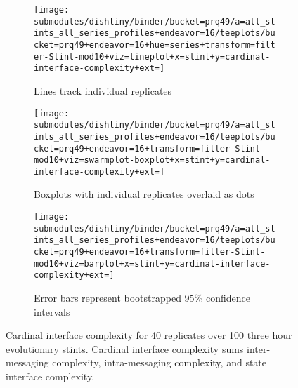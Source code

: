 \begin{figure}
\begin{center}

\begin{subfigure}[b]{\textwidth}
\centering
\texttt{[image: submodules/dishtiny/binder/bucket=prq49/a=all\_stints\_all\_series\_profiles+endeavor=16/teeplots/bucket=prq49+endeavor=16+hue=series+transform=filter-Stint-mod10+viz=lineplot+x=stint+y=cardinal-interface-complexity+ext=]}%
\caption{
Lines track individual replicates
}
\label{fig:cardinal-interface-complexity-vs-stint-lineplot}
\end{subfigure}

\begin{subfigure}[b]{\columnwidth}
\centering
\texttt{[image: submodules/dishtiny/binder/bucket=prq49/a=all\_stints\_all\_series\_profiles+endeavor=16/teeplots/bucket=prq49+endeavor=16+transform=filter-Stint-mod10+viz=swarmplot-boxplot+x=stint+y=cardinal-interface-complexity+ext=]}
\caption{
Boxplots with individual replicates overlaid as dots
}
\label{fig:cardinal-interface-complexity-vs-stint-boxplot}
\end{subfigure}

\begin{subfigure}[b]{\columnwidth}
\centering
\texttt{[image: submodules/dishtiny/binder/bucket=prq49/a=all\_stints\_all\_series\_profiles+endeavor=16/teeplots/bucket=prq49+endeavor=16+transform=filter-Stint-mod10+viz=barplot+x=stint+y=cardinal-interface-complexity+ext=]}
\caption{
Error bars represent bootstrapped 95\% confidence intervals
}
\label{fig:cardinal-interface-complexity-vs-stint-barplot}
\end{subfigure}

\caption{
Cardinal interface complexity for 40 replicates over 100 three hour evolutionary stints.
Cardinal interface complexity sums inter-messaging complexity, intra-messaging complexity, and state interface complexity.
}
\label{fig:cardinal-interface-complexity-vs-stint}

\end{center}
\end{figure}
